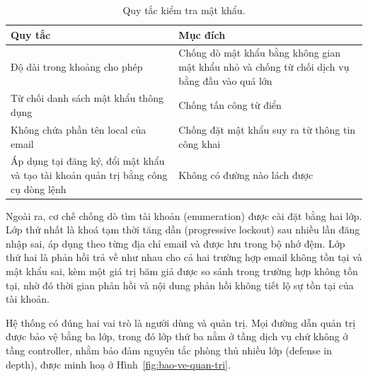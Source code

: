 \begin{table}[htbp]
    \centering
    \caption{Quy tắc kiểm tra mật khẩu.}
    \label{tab:quy-tac-mat-khau}
    \small
    \begin{tabularx}{\textwidth}{@{}>{\raggedright\arraybackslash}p{5.6cm}>{\raggedright\arraybackslash}X@{}}
        \toprule
        \textbf{Quy tắc} & \textbf{Mục đích} \\
        \midrule
        Độ dài trong khoảng cho phép & Chống dò mật khẩu bằng không gian mật khẩu nhỏ và chống từ chối dịch vụ bằng đầu vào quá lớn \\
        Từ chối danh sách mật khẩu thông dụng & Chống tấn công từ điển \\
        Không chứa phần tên local của email & Chống đặt mật khẩu suy ra từ thông tin công khai \\
        Áp dụng tại đăng ký, đổi mật khẩu và tạo tài khoản quản trị bằng công cụ dòng lệnh & Không có đường nào lách được \\
        \bottomrule
    \end{tabularx}
\end{table}

Ngoài ra, cơ chế chống dò tìm tài khoản (enumeration) được cài đặt bằng hai lớp. Lớp thứ nhất là khoá tạm thời tăng dần (progressive lockout) sau nhiều lần đăng nhập sai, áp dụng theo từng địa chỉ email và được lưu trong bộ nhớ đệm. Lớp thứ hai là phản hồi trả về như nhau cho cả hai trường hợp email không tồn tại và mật khẩu sai, kèm một giá trị băm giả được so sánh trong trường hợp không tồn tại, nhờ đó thời gian phản hồi và nội dung phản hồi không tiết lộ sự tồn tại của tài khoản.

Hệ thống có đúng hai vai trò là người dùng và quản trị. Mọi đường dẫn quản trị được bảo vệ bằng ba lớp, trong đó lớp thứ ba nằm ở tầng dịch vụ chứ không ở tầng controller, nhằm bảo đảm nguyên tắc phòng thủ nhiều lớp (defense in depth), được minh hoạ ở Hình~\ref{fig:bao-ve-quan-tri}.

